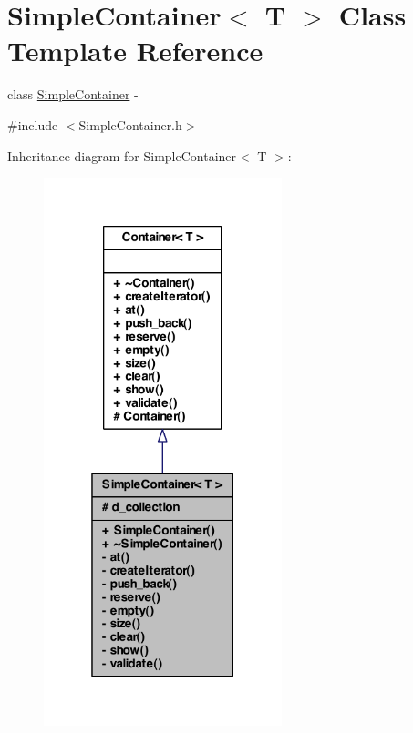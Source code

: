 \hypertarget{class_simple_container}{
\section{SimpleContainer$<$ T $>$ Class Template Reference}
\label{class_simple_container}
}


class \hyperlink{class_simple_container}{SimpleContainer} -\/  




{\ttfamily \#include $<$SimpleContainer.h$>$}



Inheritance diagram for SimpleContainer$<$ T $>$:
\nopagebreak
\begin{figure}[H]
\begin{center}
\leavevmode
\includegraphics[width=196pt]{class_simple_container__inherit__graph}
\end{center}
\end{figure}


